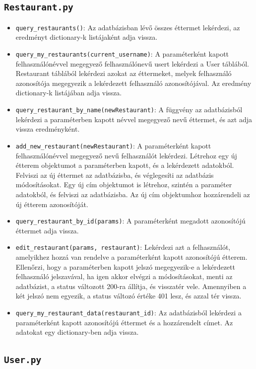 \subsection{\texttt{Restaurant.py}}

\begin{itemize}
\item \texttt{query\_restaurants()}:
Az adatbázisban lévő összes éttermet lekérdezi, az eredményt dictionary-k listájaként adja vissza.
\item \texttt{query\_my\_restaurants(current\_username)}:
A paraméterként kapott felhasználónévvel megegyező felhasználónevű usert lekérdezi a User táblából. Restaurant táblából lekérdezi azokat az éttermeket, melyek felhasználó azonosítója megegyezik a lekérdezett felhasználó azonosítójával. Az eredmény dictionary-k listájában adja vissza.
\item \texttt{query\_restaurant\_by\_name(newRestaurant)}:
A függvény az adatbázisból lekérdezi a paraméterben kapott névvel megegyező nevű éttermet, és azt adja vissza eredményként.
\item \texttt{add\_new\_restaurant(newRestaurant)}:
A paraméterként kapott felhasználónévvel megegyező nevű felhasználót lekérdezi. Létrehoz egy új étterem objektumot a paraméterben kapott, és a lekérdezett adatokból. Felviszi az új éttermet az adatbázisba, és véglegesíti az adatbázis módosításokat. Egy új cím objektumot is létrehoz, szintén a paraméter adatokból, és felviszi az adatbázisba. Az új cím objektumhoz hozzárendeli az új étterem azonosítóját.
\item \texttt{query\_restaurant\_by\_id(params)}:
A paraméterként megadott azonosítójú éttermet adja vissza.
\item \texttt{edit\_restaurant(params, restaurant)}:
Lekérdezi azt a felhasználót, amelyikhez hozzá van rendelve a paraméterként kapott azonosítójú étterem. Ellenőrzi, hogy a paraméterben kapott jelszó megegyezik-e a lekérdezett felhasználó jelszavával, ha igen akkor elvégzi a módosításokat, menti az adatbázist, a status változott 200-ra állítja, és visszatér vele. Amennyiben a két jelszó nem egyezik, a status változó értéke 401 lesz, és azzal tér vissza.
\item \texttt{query\_my\_restaurant\_data(restaurant\_id)}:
Az adatbázisból lekérdezi a paraméterként kapott azonosítójú éttermet és a hozzárendelt címet. Az adatokat egy dictionary-ben adja vissza.
\end{itemize}

\subsection{\texttt{User.py}}

